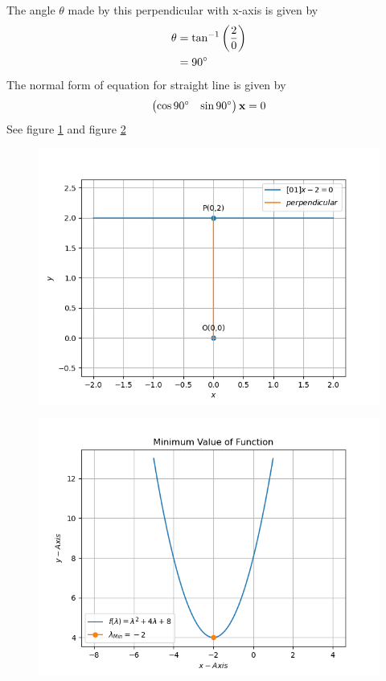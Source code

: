\documentclass[12pt]{article}
\providecommand{\brak}[1]{\ensuremath{\left(#1\right)}}
\newcommand{\myvec}[1]{\ensuremath{\begin{pmatrix}#1\end{pmatrix}}}
\let\vec\mathbf
\begin{document}
The angle $\theta$ made by this perpendicular with x-axis is given by
\begin{align}
	\theta &= \tan^{-1}{\brak{\frac{2}{0}}}\\
	&= 90\degree
\end{align}
The normal form of equation for straight line is given by 
\begin{align}
	\myvec{\cos{90}\degree&\sin{90}\degree}\vec{x} = 0
\end{align}
See figure \ref{fig:Fig1} and figure \ref{fig:Fig2}
\begin{figure}[!h]
	\begin{center} 
	    \includegraphics[width=\columnwidth]{figs/opt1}
	\end{center}
\caption{}
\label{fig:Fig1}
\end{figure}
\begin{figure}[!h]
	\begin{center} 
	    \includegraphics[width=\columnwidth]{figs/opt2}
	\end{center}
\caption{}
\label{fig:Fig2}
\end{figure}
\end{document}
